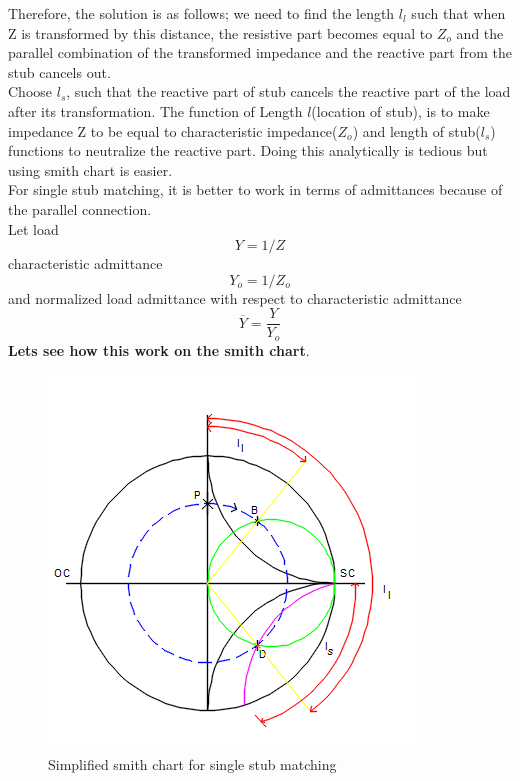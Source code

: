 Therefore, the solution is as follows; we need to find the length $ l_l$  such that when Z is transformed by this distance, the resistive part becomes equal to $Z_o$ and the parallel combination of the transformed impedance and the reactive part from the stub cancels out.\\

Choose $l_s$, such that the reactive part of stub cancels the reactive part of the load after its transformation. The function of Length $l$(location of stub), is to make impedance Z to be equal to characteristic impedance($Z_o$) and length of stub($l_s$) functions to neutralize the reactive part. Doing this analytically  is tedious but using smith chart is easier.\\

For single stub matching, it is better to work in terms of admittances because of the parallel connection.\\
Let load 
\begin{equation}
Y = 1/Z
\end{equation}
characteristic admittance 
\begin{equation} Y_o = 1/Z_o\end{equation} 
and normalized load admittance with respect to characteristic admittance 
\begin{equation} 
\overline{Y}=\frac{Y}{Y_o} 
\end{equation}
\textbf{Lets see how this work on the smith chart}. %
\begin{figure}[h]
\centering
\includegraphics[width=1\linewidth]{./graphics/qwtch}
\caption{Simplified smith chart for single stub matching}
\end{figure}
